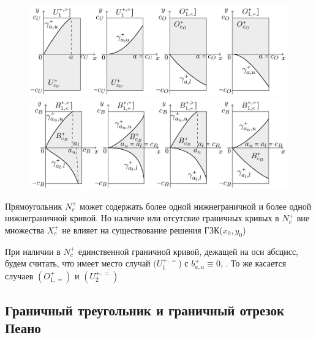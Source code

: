 \begin{figure}[!h]
    \begin{subcaptionblock}{\textwidth}
        \includegraphics[width=0.99\textwidth]{boundary_curves_1}
    \end{subcaptionblock}
    \begin{subcaptionblock}{\textwidth}
    	\includegraphics[width=0.99\textwidth]{boundary_curves_2}
    \end{subcaptionblock}
\end{figure}

\begin{remark}
	Прямоугольник $ N_c^+ $ может содержать более одной нижнеграничной и более одной нижнеграничной кривой. Но наличие или отсутсвие граничных кривых в $ N_c^+ $ вне множества $ X_c^+ $ не влияет на существование решения ГЗК($ x_0, y_0 $)
\end{remark}

\begin{remark}
    При наличии в $ N_c^+ $ единственной граничной кривой, дежащей на оси абсцисс, будем считать, что имеет место случай $ (U_1^{+, =} $) с $ b_{a, u}^+ \equiv 0 $, \nimp[а не $ (O_{2, =}^+) $ с $ b_{a, l}^+ \equiv 0 $]. То же касается случаев $ (O_{1, =}^+) $ и $ (U_2^{+, =}) $
\end{remark}

\subsection{Граничный треугольник и граничный отрезок Пеано}

